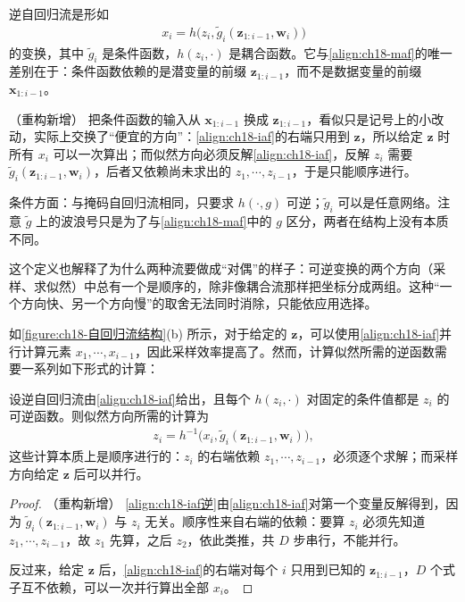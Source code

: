 \documentclass[../../main.tex]{subfiles}
\begin{document}
\begin{definition}[逆自回归流]\label{definition:ch18-逆自回归流}
逆自回归流是形如
\begin{align}
  x_i=h\big(z_i,\tilde{g}_i(\bm{z}_{1:i-1},\bm{w}_i)\big)\label{align:ch18-iaf}
\end{align}
的变换，其中 $\tilde{g}_i$ 是条件函数，$h(z_i,\cdot)$ 是耦合函数。它与\eqref{align:ch18-maf}的唯一差别在于：条件函数依赖的是潜变量的前缀 $\bm{z}_{1:i-1}$，而不是数据变量的前缀 $\bm{x}_{1:i-1}$。
\end{definition}

\begin{remark}（重构新增）
把条件函数的输入从 $\bm{x}_{1:i-1}$ 换成 $\bm{z}_{1:i-1}$，看似只是记号上的小改动，实际上交换了“便宜的方向”：\eqref{align:ch18-iaf}的右端只用到 $\bm{z}$，所以给定 $\bm{z}$ 时所有 $x_i$ 可以一次算出；而似然方向必须反解\eqref{align:ch18-iaf}，反解 $z_i$ 需要 $\tilde{g}_i(\bm{z}_{1:i-1},\bm{w}_i)$，后者又依赖尚未求出的 $z_1,\cdots,z_{i-1}$，于是只能顺序进行。

条件方面：与掩码自回归流相同，只要求 $h(\cdot,g)$ 可逆；$\tilde{g}_i$ 可以是任意网络。注意 $\tilde{g}$ 上的波浪号只是为了与\eqref{align:ch18-maf}中的 $g$ 区分，两者在结构上没有本质不同。

这个定义也解释了为什么两种流要做成“对偶”的样子：可逆变换的两个方向（采样、求似然）中总有一个是顺序的，除非像耦合流那样把坐标分成两组。这种“一个方向快、另一个方向慢”的取舍无法同时消除，只能依应用选择。
\end{remark}

如\cref{figure:ch18-自回归流结构}(b) 所示，对于给定的 $\bm{z}$，可以使用\eqref{align:ch18-iaf}并行计算元素 $x_1,\cdots,x_{i-1}$，因此采样效率提高了。然而，计算似然所需的逆函数需要一系列如下形式的计算：

\begin{proposition}[逆自回归流的逆]\label{proposition:ch18-iaf逆}
设逆自回归流由\eqref{align:ch18-iaf}给出，且每个 $h(z_i,\cdot)$ 对固定的条件值都是 $z_i$ 的可逆函数。则似然方向所需的计算为
\begin{align}
  z_i=h^{-1}\big(x_i,\tilde{g}_i(\bm{z}_{1:i-1},\bm{w}_i)\big),\label{align:ch18-iaf逆}
\end{align}
这些计算本质上是顺序进行的：$z_i$ 的右端依赖 $z_1,\cdots,z_{i-1}$，必须逐个求解；而采样方向给定 $\bm{z}$ 后可以并行。
\end{proposition}

\begin{proof}（重构新增）
\eqref{align:ch18-iaf逆}由\eqref{align:ch18-iaf}对第一个变量反解得到，因为 $\tilde{g}_i(\bm{z}_{1:i-1},\bm{w}_i)$ 与 $z_i$ 无关。顺序性来自右端的依赖：要算 $z_i$ 必须先知道 $z_1,\cdots,z_{i-1}$，故 $z_1$ 先算，之后 $z_2$，依此类推，共 $D$ 步串行，不能并行。

反过来，给定 $\bm{z}$ 后，\eqref{align:ch18-iaf}的右端对每个 $i$ 只用到已知的 $\bm{z}_{1:i-1}$，$D$ 个式子互不依赖，可以一次并行算出全部 $x_i$。
\end{proof}
\end{document}
